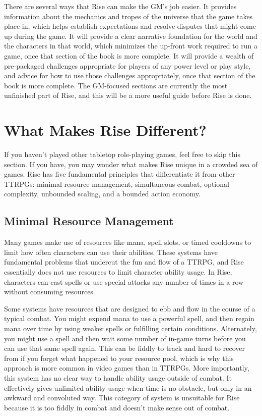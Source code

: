             There are several ways that Rise can make the GM's job easier.
            It provides information about the mechanics and tropes of the universe that the game takes place in, which helps establish expectations and resolve disputes that might come up during the game.
            It will provide a clear narrative foundation for the world and the characters in that world, which minimizes the up-front work required to run a game, once that section of the book is more complete.
            It will provide a wealth of pre-packaged challenges appropriate for players of any power level or play style, and advice for how to use those challenges appropriately, once that section of the book is more complete.
            The GM-focused sections are currently the most unfinished part of Rise, and this will be a more useful guide before Rise is done.

\section{What Makes Rise Different?}
    If you haven't played other tabletop role-playing games, feel free to skip this section.
    If you have, you may wonder what makes Rise unique in a crowded sea of games.
    Rise has five fundamental principles that differentiate it from other TTRPGs: minimal resource management, simultaneous combat, optional complexity, unbounded scaling, and a bounded action economy.

    \subsection{Minimal Resource Management}
        Many games make use of resources like mana, spell slots, or timed cooldowns to limit how often characters can use their abilities.
        These systems have fundamental problems that undercut the fun and flow of a TTRPG, and Rise essentially does not use resources to limit character ability usage.
        In Rise, characters can cast spells or use special attacks any number of times in a row without consuming resources.

        Some systems have resources that are designed to ebb and flow in the course of a typical combat.
        You might expend mana to use a powerful spell, and then regain mana over time by using weaker spells or fulfilling certain conditions.
        Alternately, you might use a spell and then wait some number of in-game turns before you can use that same spell again.
        This can be fiddly to track and hard to recover from if you forget what happened to your resource pool, which is why this approach is more common in video games than in TTRPGs.
        More importantly, this system has no clear way to handle ability usage outside of combat.
        It effectively gives unlimited ability usage when time is no obstacle, but only in an awkward and convoluted way.
        This category of system is unsuitable for Rise because it is too fiddly in combat and doesn't make sense out of combat.

